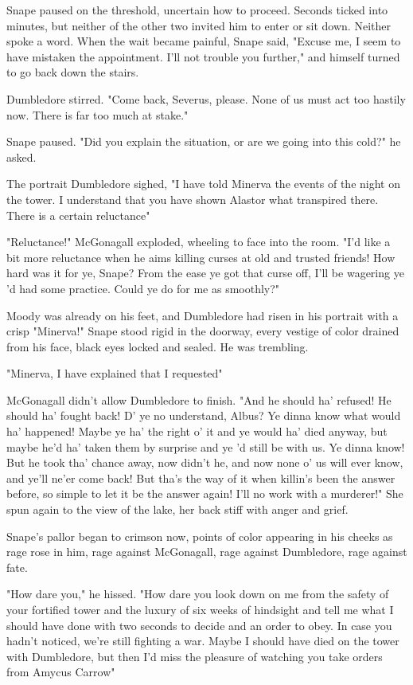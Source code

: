 Snape paused on the threshold, uncertain how to proceed. Seconds ticked into minutes, but neither of the other two invited him to enter or sit down. Neither spoke a word. When the wait became painful, Snape said, "Excuse me, I seem to have mistaken the appointment. I'll not trouble you further," and himself turned to go back down the stairs.

Dumbledore stirred. "Come back, Severus, please. None of us must act too hastily now. There is far too much at stake."

Snape paused. "Did you explain the situation, or are we going into this cold?" he asked.

The portrait Dumbledore sighed, "I have told Minerva the events of the night on the tower. I understand that you have shown Alastor what transpired there. There is a certain reluctance{\el}"

"Reluctance!" McGonagall exploded, wheeling to face into the room. "I'd like a bit more reluctance when he aims killing curses at old and trusted friends! How hard was it for ye, Snape? From the ease ye got that curse off, I'll be wagering ye 'd had some practice. Could ye do for me as smoothly?"

Moody was already on his feet, and Dumbledore had risen in his portrait with a crisp "Minerva!" Snape stood rigid in the doorway, every vestige of color drained from his face, black eyes locked and sealed. He was trembling.

"Minerva, I have explained that I requested{\el}"

McGonagall didn't allow Dumbledore to finish. "And he should ha' refused! He should ha' fought back! D' ye no understand, Albus? Ye dinna know what would ha' happened! Maybe ye ha' the right o' it and ye would ha' died anyway, but maybe he'd ha' taken them by surprise and ye 'd still be with us. Ye dinna know! But he took tha' chance away, now didn't he, and now none o' us will ever know, and ye'll ne'er come back! But tha's the way of it when killin's been the answer before, so simple to let it be the answer again! I'll no work with a murderer!" She spun again to the view of the lake, her back stiff with anger and grief.

Snape's pallor began to crimson now, points of color appearing in his cheeks as rage rose in him, rage against McGonagall, rage against Dumbledore, rage against fate.

"How dare you," he hissed. "How dare you look down on me from the safety of your fortified tower and the luxury of six weeks of hindsight and tell me what I should have done with two seconds to decide and an order to obey. In case you hadn't noticed, we're still fighting a war. Maybe I should have died on the tower with Dumbledore, but then I'd miss the pleasure of watching you take orders from Amycus Carrow{\el}"

